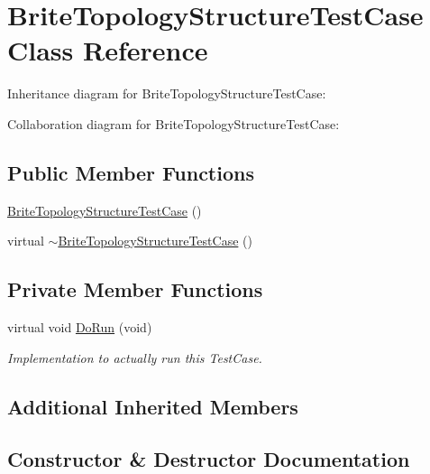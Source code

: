 \hypertarget{classBriteTopologyStructureTestCase}{}\section{Brite\+Topology\+Structure\+Test\+Case Class Reference}
\label{classBriteTopologyStructureTestCase}


Inheritance diagram for Brite\+Topology\+Structure\+Test\+Case\+:


Collaboration diagram for Brite\+Topology\+Structure\+Test\+Case\+:
\subsection*{Public Member Functions}
\begin{DoxyCompactItemize}
\item 
\hyperlink{classBriteTopologyStructureTestCase_aa49b31ee83eae2a717f7df8def43226a}{Brite\+Topology\+Structure\+Test\+Case} ()
\item 
virtual \hyperlink{classBriteTopologyStructureTestCase_a20095660f3fad29f60cd6be8e79dfb4d}{$\sim$\+Brite\+Topology\+Structure\+Test\+Case} ()
\end{DoxyCompactItemize}
\subsection*{Private Member Functions}
\begin{DoxyCompactItemize}
\item 
virtual void \hyperlink{classBriteTopologyStructureTestCase_ac13fcdb7f752c3ae580f473a1a245619}{Do\+Run} (void)
\begin{DoxyCompactList}\small\item\em Implementation to actually run this Test\+Case. \end{DoxyCompactList}\end{DoxyCompactItemize}
\subsection*{Additional Inherited Members}


\subsection{Constructor \& Destructor Documentation}
